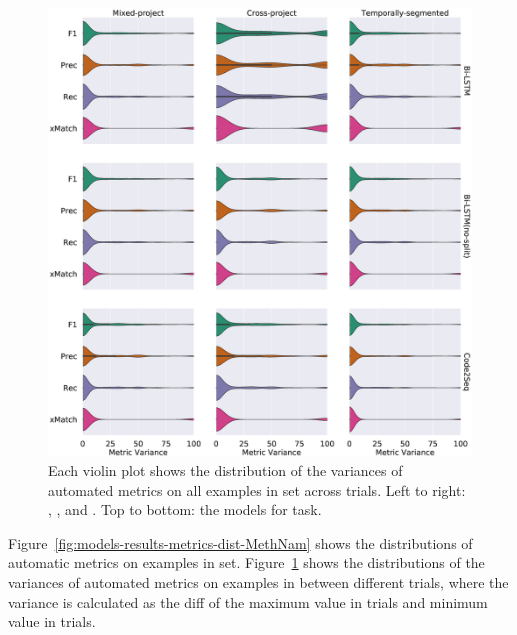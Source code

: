 \begin{figure}[t]
  \centering
  \includegraphics[width=\columnwidth]{figs/models-results-variance-dist-MethNam.eps}
  \caption{Each violin plot shows the distribution of the variances of
    automated metrics on all examples in \test set across \NumTrial
    trials.  Left to right: \mixedproj, \crossproj, and \evoaware
    \methodologies.  Top to bottom: the models for \methnam
    task. \label{fig:models-results-variance-dist-MethNam}}
\end{figure}

Figure~\ref{fig:models-results-metrics-dist-MethNam} shows the
distributions of automatic metrics on examples in \test set.
Figure~\ref{fig:models-results-variance-dist-MethNam} shows the
distributions of the variances of automated metrics on examples in
\test between \NumTrial different trials, where the variance is
calculated as the diff of the maximum value in \NumTrial trials and
minimum value in \NumTrial trials.


